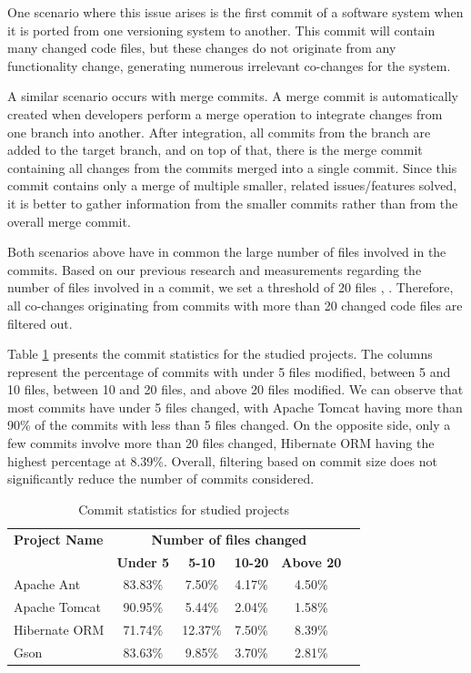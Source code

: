 \documentclass[12pt, a4paper, twoside]{report}
\begin{document}
One scenario where this issue arises is the first commit of a software system when it is ported from one versioning system to another. This commit will contain many changed code files, but these changes do not originate from any functionality change, generating numerous irrelevant co-changes for the system.

A similar scenario occurs with merge commits. A merge commit is automatically created when developers perform a merge operation to integrate changes from one branch into another. After integration, all commits from the branch are added to the target branch, and on top of that, there is the merge commit containing all changes from the commits merged into a single commit. Since this commit contains only a merge of multiple smaller, related issues/features solved, it is better to gather information from the smaller commits rather than from the overall merge commit.

Both scenarios above have in common the large number of files involved in the commits. Based on our previous research and measurements regarding the number of files involved in a commit, we set a threshold of 20 files \cite{b4}, \cite{b5}. Therefore, all co-changes originating from commits with more than 20 changed code files are filtered out.


Table \ref{tab:commit_statistics} presents the commit statistics for the studied projects. The columns represent the percentage of commits with under 5 files modified, between 5 and 10 files, between 10 and 20 files, and above 20 files modified. We can observe that most commits have under 5 files changed, with Apache Tomcat having more than 90\% of the commits with less than 5 files changed. On the opposite side, only a few commits involve more than 20 files changed, Hibernate ORM having the highest percentage at 8.39\%. Overall, filtering based on commit size does not significantly reduce the number of commits considered.

\begin{table}[ht]
    \centering
    \caption{Commit statistics for studied projects}
    \label{tab:commit_statistics}
    \begin{tabular}{|l|c|c|c|c|c|}
        \hline
	 \textbf{Project Name} & \multicolumn{4}{c|}{\textbf{{Number of files changed} }}  \\ 
	\cline{2-5}
         & \textbf{Under 5} & \textbf{5-10} & \textbf{10-20} & \textbf{Above 20} \\ \hline
        Apache Ant & 83.83\% & 7.50\% & 4.17\% & 4.50\% \\ 
        Apache Tomcat & 90.95\% & 5.44\% & 2.04\% & 1.58\%  \\ 
        Hibernate ORM & 71.74\% & 12.37\% & 7.50\% & 8.39\%  \\ 
        Gson & 83.63\% & 9.85\% & 3.70\% & 2.81\%  \\ \hline
    \end{tabular}
\end{table}
\end{document}
